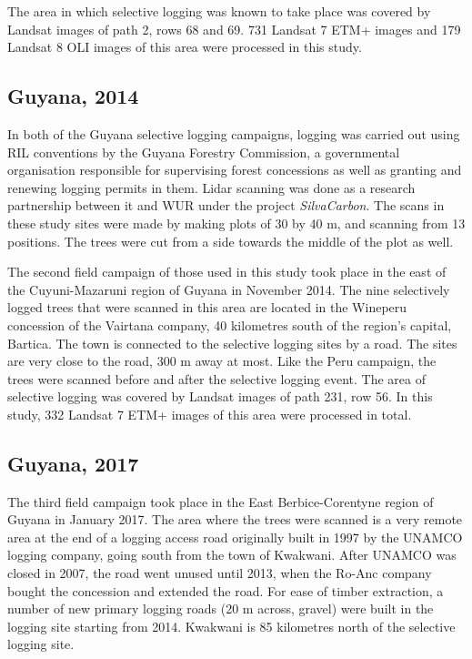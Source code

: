 \documentclass[a4paper,12pt]{scrbook}
\begin{document}
The area in which selective logging was known to take place was covered by Landsat images of path 2, rows 68 and 69. 731 Landsat 7 \ac{ETM+} images and 179 Landsat 8 \ac{OLI} images of this area were processed in this study.

\subsection{Guyana, 2014}

In both of the Guyana selective logging campaigns, logging was carried out using \ac{RIL} conventions by the Guyana Forestry Commission, a governmental organisation responsible for supervising forest concessions as well as granting and renewing logging permits in them. Lidar scanning was done as a research partnership between it and \ac{WUR} under the project \textit{SilvaCarbon}. The scans in these study sites were made by making plots of 30 by 40 m, and scanning from 13 positions. The trees were cut from a side towards the middle of the plot as well.%

The second field campaign of those used in this study took place in the east of the Cuyuni-Mazaruni region of Guyana in November 2014. The nine selectively logged trees that were scanned in this area are located in the Wineperu concession of the Vairtana company, 40 kilometres south of the region's capital, Bartica. The town is connected to the selective logging sites by a road. The sites are very close to the road, 300 m away at most. Like the Peru campaign, the trees were scanned before and after the selective logging event. The area of selective logging was covered by Landsat images of path 231, row 56. In this study, 332 Landsat 7 \ac{ETM+} images of this area were processed in total.

\subsection{Guyana, 2017}

The third field campaign took place in the East Berbice-Corentyne region of Guyana in January 2017. The area where the trees were scanned is a very remote area at the end of a logging access road originally built in 1997 by the UNAMCO logging company, going south from the town of Kwakwani. After UNAMCO was closed in 2007, the road went unused until 2013, when the Ro-Anc company bought the concession and extended the road. For ease of timber extraction, a number of new primary logging roads (20 m across, gravel) were built in the logging site starting from 2014. Kwakwani is 85 kilometres north of the selective logging site.
\end{document}

